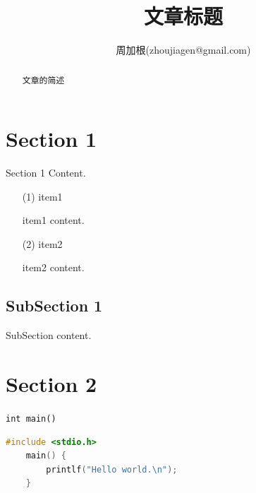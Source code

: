 \documentclass{article}
\title{文章标题}
\author{周加根(zhoujiagen@gmail.com)}
\begin{document}
\setlength{\parskip}{0.5em}

\maketitle

\renewcommand\abstractname{简述}
\begin{abstract}
\setlength{\parskip}{0.5em}
文章的简述
\end{abstract}

\newpage

\renewcommand\contentsname{目录}
\tableofcontents

\newpage

\section{Section 1}

Section 1 Content.

\begin{enumerate}[itemsep=0pt,parsep=0pt,label=(\arabic*)]
\item[(1)] item1

item1 content.

\item[(2)] item2

item2 content.

\end{enumerate}

\subsection{SubSection 1}

SubSection content.

\newpage
\section{Section 2}

\texttt{int main() {}}

\lstset{ basicstyle=\ttfamily, keywordstyle=\bfseries, commentstyle=\ttfamily, numbers=right, numberstyle=\footnotesize }
\begin{lstlisting}[language=C]
	#include <stdio.h>
	main() {
	    printlf("Hello world.\n");
	}
\end{lstlisting}


\cite{frontiers-mda}
\end{document}
